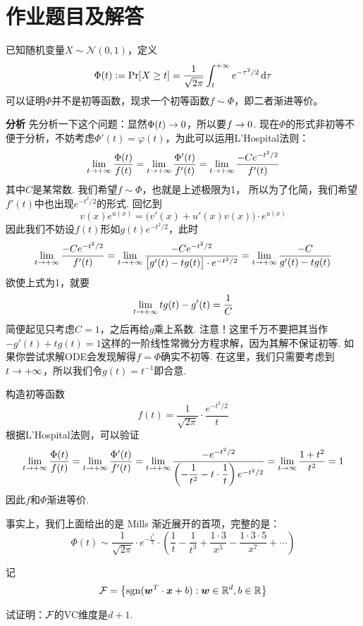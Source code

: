 \chapter{作业题目及解答} \label{chap:homework}


\begin{exercise} 
已知随机变量$X \sim \mathcal{N}(0, 1)$，定义 
\[
\Phi(t) := \Pr[X \ge t] = \dfrac{1}{\sqrt{2\pi}}\int_{t}^{+\infty} e^{-\tau^2/2} \dx[\tau]
\]
可以证明$\Phi$并不是初等函数，现求一个初等函数$f \sim \Phi$，即二者渐进等价。
\end{exercise}

\textbf{分析} \quad 先分析一下这个问题：显然$\Phi(t) \ra 0$，所以要$f \ra 0$. 现在$\Phi$的形式非初等不便于分析，不妨考虑$\Phi'(t) = \varphi(t)$，为此可以运用L'Hospital法则：
\[
\lim_{t \ra +\infty} \dfrac{\Phi(t)}{f(t)} = \lim_{t \ra +\infty} \dfrac{\Phi'(t)}{f'(t)} = \lim_{t \ra +\infty} \dfrac{-C e^{-t^2/2}}{f'(t)}
\]
其中$C$是某常数. 我们希望$f \sim \Phi$，也就是上述极限为1， 所以为了化简，我们希望$f'(t)$中也出现$e^{-t^2/2}$的形式. 回忆到 
\[
v(x)e^{u(x)} = \Big(v'(x) + u'(x)v(x) \Big) \cdot e^{u(x)}
\]
因此我们不妨设$f(t)$形如$g(t) e^{-t^2/2}$，此时
\[
\lim_{t \ra +\infty} \dfrac{-C e^{-t^2/2}}{f'(t)}
= \lim_{t \ra +\infty} \dfrac{-C e^{-t^2/2}}{\big[g'(t) - tg(t)\big] \cdot e^{-t^2/2}} = \lim_{t \ra +\infty}\dfrac{-C}{g'(t) - tg(t)}
\]
欲使上式为1，就要
\[
\lim_{t\ra +\infty}  tg(t) - g'(t) = \dfrac{1}{C}
\]
简便起见只考虑$C=1$，之后再给$g$乘上系数. 注意！这里千万不要把其当作$-g'(t) + tg(t) = 1$这样的一阶线性常微分方程求解，因为其解不保证初等. 如果你尝试求解ODE会发现解得$f = \Phi$确实不初等. 在这里，我们只需要考虑到$t \ra +\infty$，所以我们令$g(t) = t^{-1}$即合意.

\begin{solution}
构造初等函数 
\[
f(t) = \dfrac{1}{\sqrt{2\pi}} \cdot \dfrac{e^{-t^2/2}}{t}
\]
根据L'Hospital法则，可以验证
\[
\lim_{t\ra +\infty} \dfrac{\Phi(t)}{f(t)} = \lim_{t \ra +\infty} \dfrac{\Phi'(t)}{f'(t)} = \lim_{t \ra +\infty} \dfrac{-e^{-t^2/2}}{\left(-\dfrac{1}{t^2} - t\cdot \dfrac{1}{t}\right) e^{-t^2/2}} = \lim_{t\ra \infty}\dfrac{1+t^2}{t^2} = 1
\]
因此$f$和$\Phi$渐进等价. 
\end{solution}

事实上，我们上面给出的是 Mills 渐近展开的首项，完整的是：
\[
\Phi(t) \sim \dfrac{1}{\sqrt{2\pi}} \cdot {e^{-\frac{t^2}{2}}}
\cdot \left(
    \dfrac{1}{t} - \dfrac{1}{t^3} + \dfrac{1 \cdot 3}{x^5} - \dfrac{1 \cdot 3 \cdot 5}{x^7} + \cdots
\right)
\]


\begin{exercise}
    记 
    \[
    \ca F = \left\{
        \mathrm{sgn}(\bd{w}^T\cdot \bd{x} + b): \bd{w}\in \R^d, b\in \R 
    \right\}
    \]

    试证明：$\ca F$的VC维度是$d+1$.
\end{exercise}